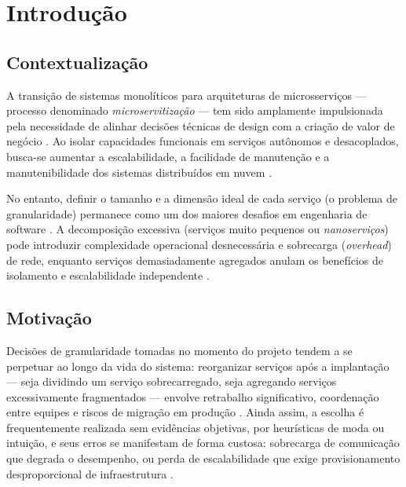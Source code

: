 
\chapter{Introdução}
\label{cap:introducao}

\section{Contextualização}

A transição de sistemas monolíticos para arquiteturas de microsserviços --- processo denominado \textit{microservitização} --- tem sido amplamente impulsionada pela necessidade de alinhar decisões técnicas de design com a criação de valor de negócio \cite{hassan2020microservice}. Ao isolar capacidades funcionais em serviços autônomos e desacoplados, busca-se aumentar a escalabilidade, a facilidade de manutenção e a manutenibilidade dos sistemas distribuídos em nuvem \cite{verarivera2021granularity}.

No entanto, definir o tamanho e a dimensão ideal de cada serviço (o problema de granularidade) permanece como um dos maiores desafios em engenharia de software \cite{hassan2020microservice, verarivera2021granularity}. A decomposição excessiva (serviços muito pequenos ou \textit{nanoserviços}) pode introduzir complexidade operacional desnecessária e sobrecarga (\textit{overhead}) de rede, enquanto serviços demasiadamente agregados anulam os benefícios de isolamento e escalabilidade independente \cite{mendonca2024serviceweaver, rego2025granularity}.

\section{Motivação}
\label{sec:motivacao}

Decisões de granularidade tomadas no momento do projeto tendem a se perpetuar ao longo da vida do sistema: reorganizar serviços após a implantação --- seja dividindo um serviço sobrecarregado, seja agregando serviços excessivamente fragmentados --- envolve retrabalho significativo, coordenação entre equipes e riscos de migração em produção \cite{hassan2020microservice}. Ainda assim, a escolha é frequentemente realizada sem evidências objetivas, por heurísticas de moda ou intuição, e seus erros se manifestam de forma custosa: sobrecarga de comunicação que degrada o desempenho, ou perda de escalabilidade que exige provisionamento desproporcional de infraestrutura \cite{gan2019deathstarbench, mendonca2024serviceweaver}.

